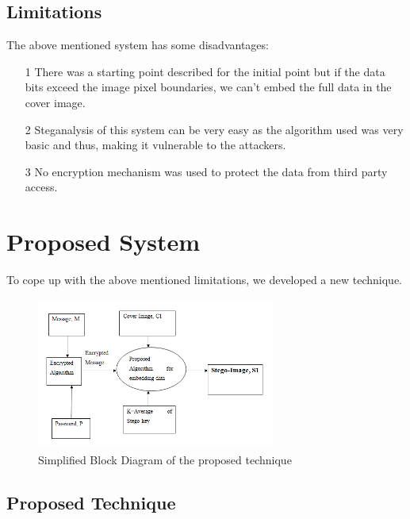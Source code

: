 \documentclass{report}
\begin{document}
\subsection{Limitations}
The above mentioned system has some disadvantages:\\
\begin{itemize}
    \item[1] There was a starting point described for the initial point but if the data bits exceed the image pixel boundaries, we can’t embed the full data in the cover image. 
    \item[2] Steganalysis of this system can be very easy as the algorithm used was very basic and thus, making it vulnerable to the attackers. 
    \item[3] No encryption mechanism was used to protect the data from third party access. 
\end{itemize}

\section{Proposed System}
To cope up with the above mentioned limitations, we developed a new technique.\\
\begin{figure}[htbp]
  \centering
  \includegraphics[width=0.7\textwidth, height=5cm]{Screenshot (363).png} 
  \caption{Simplified Block Diagram of the proposed technique}
  \label{fig:4}
\end{figure}
\subsection{Proposed Technique}
\end{document}
